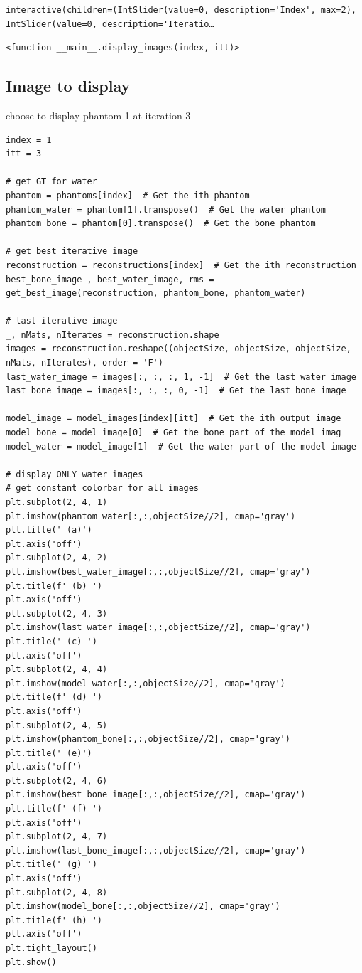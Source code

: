 \begin{verbatim}
interactive(children=(IntSlider(value=0, description='Index', max=2), IntSlider(value=0, description='Iteratio…
\end{verbatim}

\begin{verbatim}
<function __main__.display_images(index, itt)>
\end{verbatim}

\subsection{Image to display}

choose to display phantom 1 at iteration 3

\begin{verbatim}
index = 1
itt = 3

# get GT for water
phantom = phantoms[index]  # Get the ith phantom
phantom_water = phantom[1].transpose()  # Get the water phantom
phantom_bone = phantom[0].transpose()  # Get the bone phantom

# get best iterative image
reconstruction = reconstructions[index]  # Get the ith reconstruction
best_bone_image , best_water_image, rms = get_best_image(reconstruction, phantom_bone, phantom_water)

# last iterative image
_, nMats, nIterates = reconstruction.shape
images = reconstruction.reshape((objectSize, objectSize, objectSize, nMats, nIterates), order = 'F')
last_water_image = images[:, :, :, 1, -1]  # Get the last water image
last_bone_image = images[:, :, :, 0, -1]  # Get the last bone image

model_image = model_images[index][itt]  # Get the ith output image
model_bone = model_image[0]  # Get the bone part of the model imag
model_water = model_image[1]  # Get the water part of the model image

# display ONLY water images
# get constant colorbar for all images
plt.subplot(2, 4, 1)
plt.imshow(phantom_water[:,:,objectSize//2], cmap='gray')
plt.title(' (a)')
plt.axis('off')
plt.subplot(2, 4, 2)
plt.imshow(best_water_image[:,:,objectSize//2], cmap='gray')
plt.title(f' (b) ')
plt.axis('off')
plt.subplot(2, 4, 3)
plt.imshow(last_water_image[:,:,objectSize//2], cmap='gray')
plt.title(' (c) ')
plt.axis('off')
plt.subplot(2, 4, 4)
plt.imshow(model_water[:,:,objectSize//2], cmap='gray')
plt.title(f' (d) ')
plt.axis('off')
plt.subplot(2, 4, 5)
plt.imshow(phantom_bone[:,:,objectSize//2], cmap='gray')
plt.title(' (e)')
plt.axis('off')
plt.subplot(2, 4, 6)
plt.imshow(best_bone_image[:,:,objectSize//2], cmap='gray')
plt.title(f' (f) ')
plt.axis('off')
plt.subplot(2, 4, 7)
plt.imshow(last_bone_image[:,:,objectSize//2], cmap='gray')
plt.title(' (g) ')
plt.axis('off')
plt.subplot(2, 4, 8)
plt.imshow(model_bone[:,:,objectSize//2], cmap='gray')
plt.title(f' (h) ')
plt.axis('off')
plt.tight_layout()
plt.show()
\end{verbatim}

